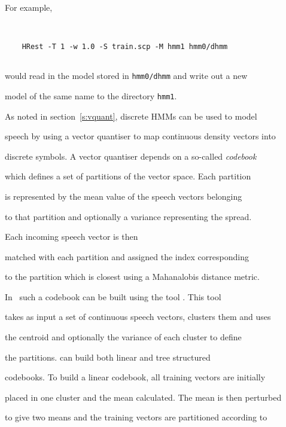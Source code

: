 For example,


\begin{verbatim}


    HRest -T 1 -w 1.0 -S train.scp -M hmm1 hmm0/dhmm


\end{verbatim}


would read in the model stored in \texttt{hmm0/dhmm} and write out a new


model of the same name to the directory \texttt{hmm1}.










As noted in section~\ref{s:vquant}, discrete HMMs can be used to model


speech by using a vector quantiser to map continuous density vectors into


discrete symbols.  A vector quantiser depends on a so-called \textit{codebook} 


which defines a set of partitions of the vector space.  Each partition


is represented by the mean value of the speech vectors belonging


to that partition and optionally  a variance representing the spread.


Each incoming speech vector is then


matched with each partition and assigned the index corresponding


to the partition which is closest using a Mahanalobis distance metric.





In \HTK\ such a codebook can be built using the tool .  This tool


takes as input a set of continuous speech vectors, clusters them and uses


the centroid and optionally the variance of each cluster to define


the partitions.   can build both linear and tree structured


codebooks.  To build a linear codebook, all training vectors are initially


placed in one cluster and the mean calculated.  The mean is then perturbed


to give two means and the training vectors are partitioned according to


